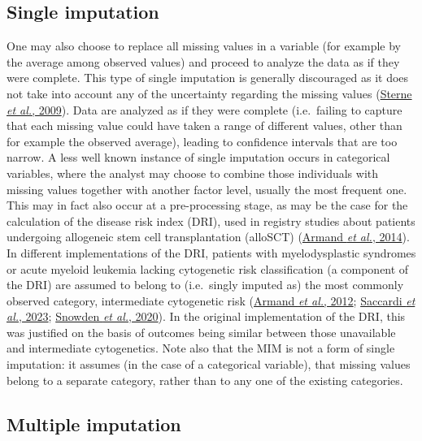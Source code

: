\documentclass[
  letterpaper,
  DIV=11,
  numbers=noendperiod]{scrreprt}
\begin{document}
\hypertarget{single-imputation}{%
\subsection{Single imputation}\label{single-imputation}}

One may also choose to replace all missing values in a variable (for
example by the average among observed values) and proceed to analyze the
data as if they were complete. This type of single imputation is
generally discouraged as it does not take into account any of the
uncertainty regarding the missing values
(\protect\hyperlink{ref-sterneMultipleImputationMissing2009}{Sterne
\emph{et al.}, 2009}). Data are analyzed as if they were complete
(i.e.~failing to capture that each missing value could have taken a
range of different values, other than for example the observed average),
leading to confidence intervals that are too narrow. A less well known
instance of single imputation occurs in categorical variables, where the
analyst may choose to combine those individuals with missing values
together with another factor level, usually the most frequent one. This
may in fact also occur at a pre-processing stage, as may be the case for
the calculation of the disease risk index (DRI), used in registry
studies about patients undergoing allogeneic stem cell transplantation
(alloSCT)
(\protect\hyperlink{ref-armandValidationRefinementDisease2014}{Armand
\emph{et al.}, 2014}). In different implementations of the DRI, patients
with myelodysplastic syndromes or acute myeloid leukemia lacking
cytogenetic risk classification (a component of the DRI) are assumed to
belong to (i.e.~singly imputed as) the most commonly observed category,
intermediate cytogenetic risk
(\protect\hyperlink{ref-armandDiseaseRiskIndex2012}{Armand \emph{et
al.}, 2012};
\protect\hyperlink{ref-saccardiBenchmarkingSurvivalOutcomes2023}{Saccardi
\emph{et al.}, 2023};
\protect\hyperlink{ref-snowdenBenchmarkingSurvivalOutcomes2020}{Snowden
\emph{et al.}, 2020}). In the original implementation of the DRI, this
was justified on the basis of outcomes being similar between those
unavailable and intermediate cytogenetics. Note also that the MIM is not
a form of single imputation: it assumes (in the case of a categorical
variable), that missing values belong to a separate category, rather
than to any one of the existing categories.

\hypertarget{multiple-imputation-1}{%
\subsection{Multiple imputation}\label{multiple-imputation-1}}
\end{document}
